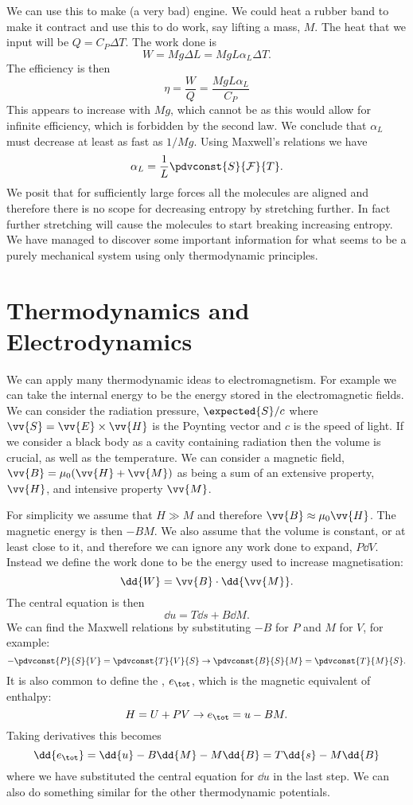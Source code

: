    We can use this to make (a very bad) engine.
    We could heat a rubber band to make it contract and use this to do work, say lifting a mass, \(M\).
    The heat that we input will be \(Q = C_P\Delta T\).
    The work done is
    \[W = Mg\Delta L = MgL\alpha_L\Delta T.\]
    The efficiency is then
    \[\eta = \frac{W}{Q} = \frac{MgL\alpha_L}{C_P}\]
    This appears to increase with \(Mg\), which cannot be as this would allow for infinite efficiency, which is forbidden by the second law.
    We conclude that \(\alpha_L\) must decrease at least as fast as \(1/Mg\).
    Using Maxwell's relations we have
    \[\alpha_L = \frac{1}{L}\pdvconst{S}{\mathcal{F}}{T}.\]
    We posit that for sufficiently large forces all the molecules are aligned and therefore there is no scope for decreasing entropy by stretching further.
    In fact further stretching will cause the molecules to start breaking increasing entropy.
    We have managed to discover some important information for what seems to be a purely mechanical system using only thermodynamic principles.
    
    \section{Thermodynamics and Electrodynamics}
    We can apply many thermodynamic ideas to electromagnetism.
    For example we can take the internal energy to be the energy stored in the electromagnetic fields.
    We can consider the radiation pressure, \(\expected{S}/c\) where \(\vv{S} = \vv{E}\times\vv{H}\) is the Poynting vector and \(c\) is the speed of light.
    If we consider a black body as a cavity containing radiation then the volume is crucial, as well as the temperature.
    We can consider a magnetic field, \(\vv{B} = \mu_0(\vv{H} + \vv{M})\) as being a sum of an extensive property, \(\vv{H}\), and intensive property \(\vv{M}\).
    
    For simplicity we assume that \(H \gg M\) and therefore \(\vv{B} \approx \mu_0\vv{H}\).
    The magnetic energy is then \(-BM\).
    We also assume that the volume is constant, or at least close to it, and therefore we can ignore any work done to expand, \(P\dd{V}\).
    Instead we define the work done to be the energy used to increase magnetisation:
    \[\dd{W} = \vv{B}\cdot\dd{\vv{M}}.\]
    The central equation is then
    \[\dd{u} = T\dd{s} + B\dd{M}.\]
    We can find the Maxwell relations by substituting \(-B\) for \(P\) and \(M\) for \(V\), for example:
    \[-\pdvconst{P}{S}{V} = \pdvconst{T}{V}{S} \rightarrow \pdvconst{B}{S}{M} = \pdvconst{T}{M}{S}.\]
    It is also common to define the , \(e_{\tot}\), which is the magnetic equivalent of enthalpy:
    \[H = U + PV \rightarrow e_{\tot} = u - BM.\]
    Taking derivatives this becomes
    \[\dd{e_{\tot}} = \dd{u} - B\dd{M} - M\dd{B} = T\dd{s} - M\dd{B}\]
    where we have substituted the central equation for \(\dd{u}\) in the last step.
    We can also do something similar for the other thermodynamic potentials.
    
